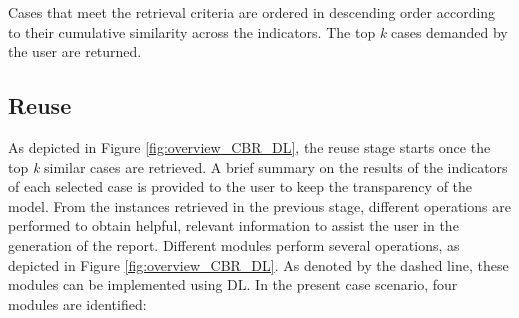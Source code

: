Cases that meet the retrieval criteria are ordered in descending order according to their cumulative similarity across the indicators. The top \textit{k} cases demanded by the user are returned.

\subsection*{Reuse}\label{5_sec:dl_powered_cbr_reuse}
As depicted in Figure \ref{fig:overview_CBR_DL}, the reuse stage starts once the top \textit{k} similar cases are retrieved. A brief summary on the results of the indicators of each selected case is provided to the user to keep the transparency of the model. From the instances retrieved in the previous stage, different operations are performed to obtain helpful, relevant information to assist the user in the generation of the report. Different modules perform several operations, as depicted in Figure \ref{fig:overview_CBR_DL}. As denoted by the dashed line, these modules can be implemented using DL. In the present case scenario, four modules are identified:
